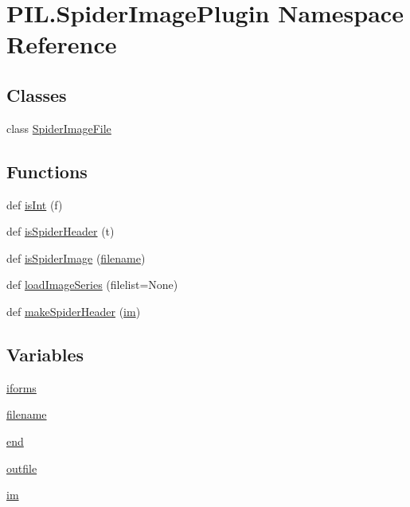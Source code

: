 \hypertarget{namespacePIL_1_1SpiderImagePlugin}{}\section{P\+I\+L.\+Spider\+Image\+Plugin Namespace Reference}
\label{namespacePIL_1_1SpiderImagePlugin}
\subsection*{Classes}
\begin{DoxyCompactItemize}
\item 
class \hyperlink{classPIL_1_1SpiderImagePlugin_1_1SpiderImageFile}{Spider\+Image\+File}
\end{DoxyCompactItemize}
\subsection*{Functions}
\begin{DoxyCompactItemize}
\item 
def \hyperlink{namespacePIL_1_1SpiderImagePlugin_a2d3d02c52aac16c3e689d5e25f785fb2}{is\+Int} (f)
\item 
def \hyperlink{namespacePIL_1_1SpiderImagePlugin_ac1bb9e3dee8cc8236ebab27ce2015985}{is\+Spider\+Header} (t)
\item 
def \hyperlink{namespacePIL_1_1SpiderImagePlugin_a974b7dfc5d0508240bf3cf2061521b4d}{is\+Spider\+Image} (\hyperlink{namespacePIL_1_1SpiderImagePlugin_ae6e60f89d03a2926c61ec1e1209195d0}{filename})
\item 
def \hyperlink{namespacePIL_1_1SpiderImagePlugin_aa15788fdf1818546ad969e4bf0692acb}{load\+Image\+Series} (filelist=None)
\item 
def \hyperlink{namespacePIL_1_1SpiderImagePlugin_af94ea9091bd3ec33390e283a79241ed4}{make\+Spider\+Header} (\hyperlink{namespacePIL_1_1SpiderImagePlugin_a071fcfcc64992997f292ea352f2dc157}{im})
\end{DoxyCompactItemize}
\subsection*{Variables}
\begin{DoxyCompactItemize}
\item 
\hyperlink{namespacePIL_1_1SpiderImagePlugin_a89a465a2e7dcb3bac62de37933903421}{iforms}
\item 
\hyperlink{namespacePIL_1_1SpiderImagePlugin_ae6e60f89d03a2926c61ec1e1209195d0}{filename}
\item 
\hyperlink{namespacePIL_1_1SpiderImagePlugin_af3044c032651c33eab482d255ba23e61}{end}
\item 
\hyperlink{namespacePIL_1_1SpiderImagePlugin_a68d1c026caef751d764e65886cae03d5}{outfile}
\item 
\hyperlink{namespacePIL_1_1SpiderImagePlugin_a071fcfcc64992997f292ea352f2dc157}{im}
\end{DoxyCompactItemize}


